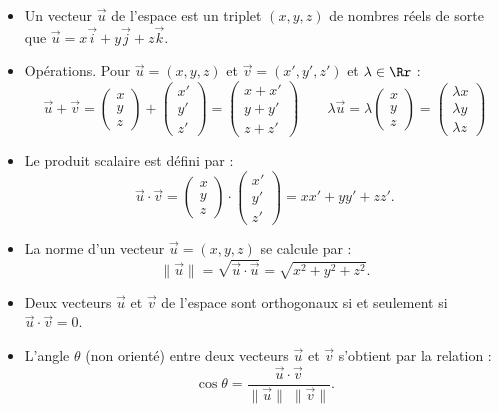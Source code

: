 \documentclass[11pt,class=report,crop=false]{standalone}
\begin{document}
\begin{itemize}
    \item Un vecteur $\vec u$ de l'espace est un triplet $(x,y,z)$ de nombres réels de sorte que $\vec u = x \vec{i} + y \vec{j} + z \vec{k}$.


    \item Opérations. Pour $\vec u = (x,y,z)$ et $\vec v = (x',y',z')$ et $\lambda \in \Rr$ :
$$
    \vec u + \vec v = \begin{pmatrix}x \\ y \\ z \end{pmatrix} + \begin{pmatrix}x' \\ y' \\ z' \end{pmatrix} = \begin{pmatrix}x + x' \\ y + y' \\ z + z' \end{pmatrix} 
    \qquad
    \lambda \vec u = \lambda \begin{pmatrix}x \\ y \\ z \end{pmatrix} = \begin{pmatrix}\lambda x \\ \lambda y \\ \lambda z \end{pmatrix}    
$$    

    \item Le produit scalaire est défini par :
$$
    \vec u \cdot \vec v = \begin{pmatrix}x \\ y \\ z \end{pmatrix} \cdot \begin{pmatrix}x' \\ y' \\ z' \end{pmatrix} = x x' + y y' + z z'.
$$
  \item La norme d'un vecteur $\vec u = (x,y,z)$ se calcule par :
$$
    \|\vec u\| = \sqrt{\vec u \cdot \vec u} = \sqrt{x^2 + y^2 + z^2}.
$$

  \item Deux vecteurs $\vec u$ et $\vec v$ de l'espace sont orthogonaux si et seulement si $\vec u \cdot \vec v = 0$.

\item L'angle $\theta$ (non orienté) entre deux vecteurs $\vec u$ et $\vec v$ s'obtient par la relation :
$$\cos \theta = \frac{\vec u \cdot \vec v}{\|\vec u\| \; \|\vec v\|}.$$
\end{itemize}
\end{document}
